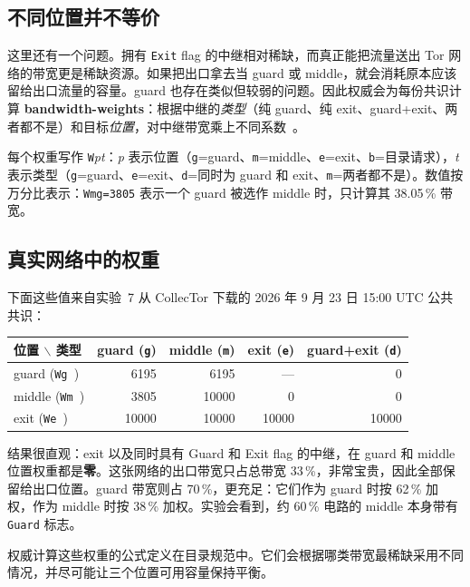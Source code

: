 \subsection{不同位置并不等价}

这里还有一个问题。拥有 \texttt{Exit} flag 的中继相对稀缺，而真正能把流量送出 Tor 网络的带宽更是稀缺资源。如果把出口拿去当 guard 或 middle，就会消耗原本应该留给出口流量的容量。guard 也存在类似但较弱的问题。因此权威会为每份共识计算 \textbf{bandwidth-weights}：根据中继的\emph{类型}（纯 guard、纯 exit、guard+exit、两者都不是）和目标\emph{位置}，对中继带宽乘上不同系数~。

每个权重写作 \texttt{W}\emph{pt}：\emph{p} 表示位置（\texttt{g}=guard、\texttt{m}=middle、\texttt{e}=exit、\texttt{b}=目录请求），\emph{t} 表示类型（\texttt{g}=guard、\texttt{e}=exit、\texttt{d}=同时为 guard 和 exit、\texttt{m}=两者都不是）。数值按万分比表示：\texttt{Wmg=3805} 表示一个 guard 被选作 middle 时，只计算其 38.05\,\% 带宽。

\subsection{真实网络中的权重}

下面这些值来自实验~7 从 CollecTor 下载的 2026 年 9 月 23 日 15:00 UTC 公共共识：
\begin{center}
\begin{tabular}{lrrrr}
\toprule
位置 $\backslash$ 类型 & guard (\texttt{g}) & middle (\texttt{m}) & exit (\texttt{e}) & guard+exit (\texttt{d}) \\
\midrule
guard (\texttt{Wg\,}) & 6195 & 6195 & --- & 0 \\
middle (\texttt{Wm\,}) & 3805 & 10000 & 0 & 0 \\
exit (\texttt{We\,}) & 10000 & 10000 & 10000 & 10000 \\
\bottomrule
\end{tabular}
\end{center}

结果很直观：exit 以及同时具有 Guard 和 Exit flag 的中继，在 guard 和 middle 位置权重都是\textbf{零}。这张网络的出口带宽只占总带宽 33\,\%，非常宝贵，因此全部保留给出口位置。guard 带宽则占 70\,\%，更充足：它们作为 guard 时按 62\,\% 加权，作为 middle 时按 38\,\% 加权。实验会看到，约 60\,\% 电路的 middle 本身带有 \texttt{Guard} 标志。

权威计算这些权重的公式定义在目录规范中。它们会根据哪类带宽最稀缺采用不同情况，并尽可能让三个位置可用容量保持平衡。

